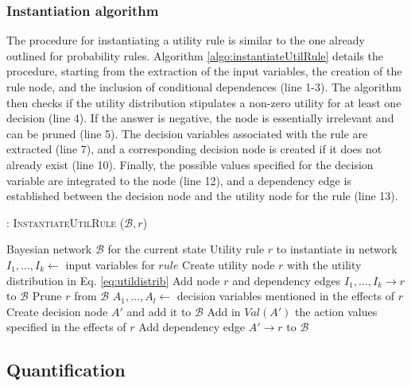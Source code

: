 \subsubsection*{Instantiation algorithm} 

The procedure for instantiating a utility rule is similar to the one already outlined for probability rules. Algorithm \ref{algo:instantiateUtilRule} details the procedure, starting from the extraction of the input variables, the creation of the rule node, and the inclusion of conditional dependences (line 1-3). The algorithm then checks if the utility distribution stipulates a non-zero utility for at least one decision (line 4).  If the answer is negative, the node is essentially irrelevant and can be pruned (line 5).  The decision variables associated with the rule are extracted (line 7), and a corresponding decision node is created if it does not already exist (line 10). Finally, the possible values specified for the decision variable are integrated to the node (line 12), and a dependency edge is established between the decision node and the utility node for the rule (line 13). 

\begin{algorithm}[h!]
\caption{: \textsc{InstantiateUtilRule} ($\mathcal{B}, \mathit{r}$)}
\begin{algorithmic}[1] \vspace{1mm}
\REQUIRE Bayesian network $\mathcal{B}$ for the current state
\REQUIRE Utility rule $\mathit{r}$ to instantiate in network  \vspace{1mm}
\STATE $I_1, \dots, I_k \leftarrow $ input variables for $rule$
\STATE Create utility node $r$ with the utility distribution in Eq. \eqref{eq:utildistrib}
\STATE Add node $r$ and dependency edges $I_1, \dots, I_k \rightarrow r$ to $\mathcal{B}$ 
\STATE Prune $r$ from $\mathcal{B}$
\ELSE
\STATE $A_1, \dots, A_l \leftarrow$ decision variables mentioned in the effects of $r$
\STATE Create decision node $A'$ and add it to $\mathcal{B}$
\ENDIF
\STATE Add in $\mathit{Val}(A')$ the action values specified in the effects of $r$
\STATE Add dependency edge $A' \rightarrow r$ to $\mathcal{B}$ 
\ENDFOR
\ENDIF
\end{algorithmic}
\label{algo:instantiateUtilRule}
\end{algorithm}

\subsection{Quantification}
\label{sec:applicationquantif}

